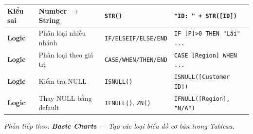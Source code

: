 \documentclass[12pt]{article}
\begin{document}
\begin{center}
\begin{tabularx}{\linewidth}{l X l X}
\textbf{Kiểu sai} & Number $\rightarrow$ String & \texttt{STR()} & \texttt{"ID: " + STR([ID])} \\
\midrule
\textbf{Logic} & Phân loại nhiều nhánh & \texttt{IF/ELSEIF/ELSE/END} & \texttt{IF [P]>0 THEN "Lãi" ...} \\
\textbf{Logic} & Phân loại theo giá trị & \texttt{CASE/WHEN/THEN/END} & \texttt{CASE [Region] WHEN ...} \\
\textbf{Logic} & Kiểm tra NULL & \texttt{ISNULL()} & \texttt{ISNULL([Customer ID])} \\
\textbf{Logic} & Thay NULL bằng default & \texttt{IFNULL()}, \texttt{ZN()} & \texttt{IFNULL([Region], "N/A")} \\
\bottomrule
\end{tabularx}
\end{center}

\vspace{1em}
\noindent \textit{Phần tiếp theo: \textbf{Basic Charts} --- Tạo các loại biểu đồ cơ bản trong Tableau.}
\end{document}
